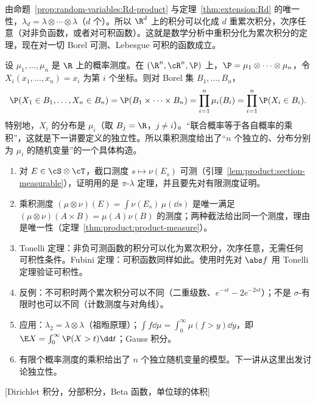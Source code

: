 \begin{example}[$d$ 维 Lebesgue 测度]
由命题~\ref{prop:random-variables:Rd-product} 与定理~\ref{thm:extension:Rd} 的唯一性，$\lambda_d=\lambda\otimes\cdots\otimes\lambda$（$d$ 个）。所以 $\R^d$ 上的积分可以化成 $d$ 重累次积分，次序任意（对非负函数，或者对可积函数）。这就是数学分析中重积分化为累次积分的定理，现在对一切 Borel 可测、Lebesgue 可积的函数成立。
\end{example}

\begin{example}[$n$ 次独立试验的模型]\label{ex:product:independent-trials}
设 $\mu_1,\dots,\mu_n$ 是 $\R$ 上的概率测度。在 $(\R^n,\cR^n,\P)$ 上，$\P=\mu_1\otimes\cdots\otimes\mu_n$，令 $X_i(x_1,\dots,x_n)=x_i$ 为第 $i$ 个坐标。则对 Borel 集 $B_1,\dots,B_n$，
\[
\P(X_1\in B_1,\dots,X_n\in B_n)=\P(B_1\times\cdots\times B_n)=\prod_{i=1}^n\mu_i(B_i)=\prod_{i=1}^n\P(X_i\in B_i).
\]
特别地，$X_i$ 的分布是 $\mu_i$（取 $B_j=\R$，$j\neq i$）。“联合概率等于各自概率的乘积”，这就是下一讲要定义的独立性。所以乘积测度给出了“$n$ 个独立的、分布分别为 $\mu_i$ 的随机变量”的一个具体构造。
\end{example}


\begin{enumerate}
\item 对 $E\in\cS\otimes\cT$，截口测度 $s\mapsto\nu(E_s)$ 可测（引理~\ref{lem:product:section-measurable}），证明用的是 $\pi$-$\lambda$ 定理，并且要先对有限测度证明。
\item 乘积测度 $(\mu\otimes\nu)(E)=\int\nu(E_s)\,\mu(\dd s)$ 是唯一满足 $(\mu\otimes\nu)(A\times B)=\mu(A)\nu(B)$ 的测度；两种截法给出同一个测度，理由是唯一性（定理~\ref{thm:product:product-measure}）。
\item Tonelli 定理：非负可测函数的积分可以化为累次积分，次序任意，无需任何可积性条件。Fubini 定理：可积函数同样如此。使用时先对 $\abs f$ 用 Tonelli 定理验证可积性。
\item 反例：不可积时两个累次积分可以不同（二重级数、$e^{-st}-2e^{-2st}$）；不是 $\sigma$-有限时也可以不同（计数测度与对角线）。
\item 应用：$\lambda_2=\lambda\otimes\lambda$（祖暅原理）；$\int f\dd\mu=\int_0^\infty\mu(f>y)\dd y$，即 $\E X=\int_0^\infty \P(X>t)\dd t$；Gauss 积分。
\item 有限个概率测度的乘积给出了 $n$ 个独立随机变量的模型。下一讲从这里出发讨论独立性。
\end{enumerate}

[Dirichlet 积分，分部积分，Beta 函数，单位球的体积]
\label{hw:product-measures}

